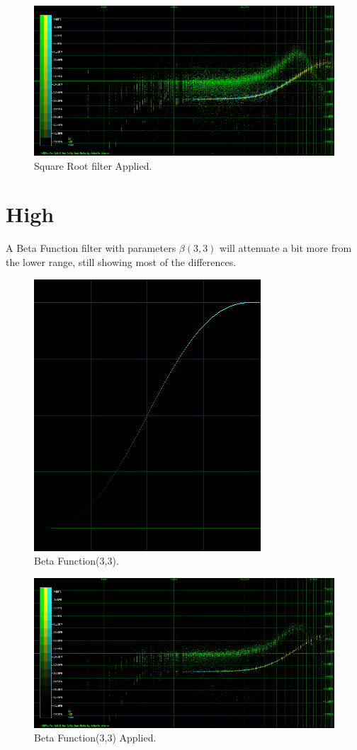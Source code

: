\documentclass[10pt,a4paper]{report}
\begin{document}
\begin{appendices}
\begin{figure}[H]
	\centering
	\includegraphics[width=1\linewidth]{images/colorfilter/BetaFunctionPlot_1_Data.png}
	\caption[Square Root filter]{Square Root filter Applied.}
	\label{fig:betafunctionplot1data}
\end{figure}

\section{High}

A Beta Function filter with parameters $\beta(3,3)$ will attenuate a bit more from the lower range, still showing most of the differences.

\begin{figure}[H]
	\centering
	\includegraphics[width=0.4\linewidth]{images/colorfilter/BetaFunctionPlot_2.png}
	\caption[Beta Function(3,3)]{Beta Function(3,3).}
	\label{fig:betafunctionplot2}
\end{figure}

\begin{figure}[H]
	\centering
	\includegraphics[width=1\linewidth]{images/colorfilter/BetaFunctionPlot_2_Data.png}
	\caption[Beta Function(3,3)]{Beta Function(3,3) Applied.}
	\label{fig:betafunctionplot2data}
\end{figure}


\end{appendices}
\end{document}
